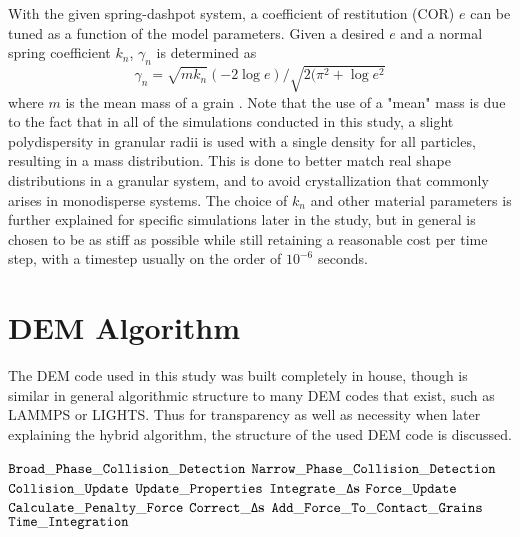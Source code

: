 With the given spring-dashpot system, a coefficient of restitution (COR) $e$ can be tuned as a function of the model parameters. Given a desired $e$ and a normal spring coefficient $k_n$, $\gamma_n$ is determined as
$$\gamma_n=\sqrt{mk_n}(-2\log{e})/\sqrt{2(\pi^2+\log{e}^2}$$
where $m$ is the mean mass of a grain \cite{Kamrin:2014}. Note that the use of a "mean" mass is due to the fact that in all of the simulations conducted in this study, a slight polydispersity in granular radii is used with a single density for all particles, resulting in a mass distribution. This is done to better match real shape distributions in a granular system, and to avoid crystallization that commonly arises in monodisperse systems. The choice of $k_n$ and other material parameters is further explained for specific simulations later in the study, but in general is chosen to be as stiff as possible while still retaining a reasonable cost per time step, with a timestep usually on the order of $10^{-6}$ seconds.

\section{DEM Algorithm}
The DEM code used in this study was built completely in house, though is similar in general algorithmic structure to many DEM codes that exist, such as LAMMPS or LIGHTS. Thus for transparency as well as necessity when later explaining the hybrid algorithm, the structure of the used DEM code is discussed.

\begin{algorithm}
  \caption{${\tt Overall \_ DEM \_ Algorithm}$}
  \begin{algorithmic}[1]
  \State ${\tt Broad\_Phase\_Collision\_Detection}$
    \State ${\tt Narrow\_Phase\_Collision\_Detection}$
  \EndFor
  \State ${\tt Collision\_Update}$
    \State ${\tt Update\_Properties}$
    \State ${\tt Integrate\_\Delta\bold{s}}$
  \EndFor
  \State ${\tt Force\_Update}$ 
    \State ${\tt Calculate\_Penalty\_Force}$
    \State ${\tt Correct\_\Delta\bold{s}}$
    \State ${\tt Add\_Force\_To\_Contact\_Grains}$
  \EndFor
  \State ${\tt Time\_Integration}$ 
  \end{algorithmic}
  \label{alg:DEM_algorithm}
\end{algorithm}


